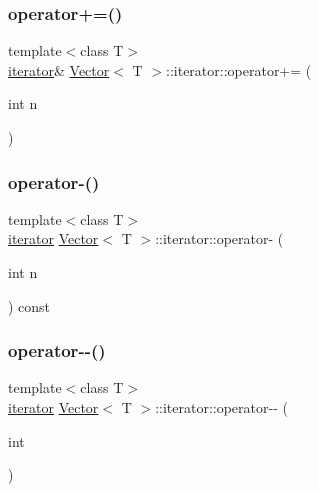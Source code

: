 \mbox{\label{classVector_1_1iterator_a5bf29b945b7717ff57ac278f7de6c158_a5bf29b945b7717ff57ac278f7de6c158}} 
\subsubsection{\texorpdfstring{operator+=()}{operator+=()}}
{\footnotesize\ttfamily template$<$class T$>$ \\
\hyperlink{classVector_1_1iterator}{iterator}\& \hyperlink{classVector}{Vector}$<$ T $>$\+::iterator\+::operator+= (\begin{DoxyParamCaption}\item[{int}]{n }\end{DoxyParamCaption})\hspace{0.3cm}{\ttfamily [inline]}}

\mbox{\label{classVector_1_1iterator_a47db88e770bfa09969c5942b09c24c46_a47db88e770bfa09969c5942b09c24c46}} 
\subsubsection{\texorpdfstring{operator-\/()}{operator-()}}
{\footnotesize\ttfamily template$<$class T$>$ \\
\hyperlink{classVector_1_1iterator}{iterator} \hyperlink{classVector}{Vector}$<$ T $>$\+::iterator\+::operator-\/ (\begin{DoxyParamCaption}\item[{int}]{n }\end{DoxyParamCaption}) const\hspace{0.3cm}{\ttfamily [inline]}}

\mbox{\label{classVector_1_1iterator_a4bbb51eb646080bf397665d903ad94d7_a4bbb51eb646080bf397665d903ad94d7}} 
\subsubsection{\texorpdfstring{operator-\/-\/()}{operator--()}\hspace{0.1cm}{\footnotesize\ttfamily [1/2]}}
{\footnotesize\ttfamily template$<$class T$>$ \\
\hyperlink{classVector_1_1iterator}{iterator} \hyperlink{classVector}{Vector}$<$ T $>$\+::iterator\+::operator-\/-\/ (\begin{DoxyParamCaption}\item[{int}]{ }\end{DoxyParamCaption})\hspace{0.3cm}{\ttfamily [inline]}}

